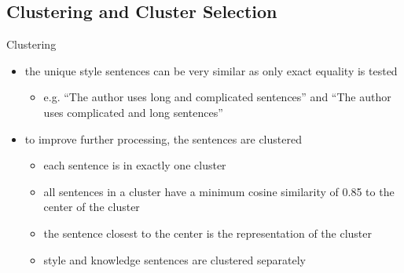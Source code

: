 \documentclass[]{beamer}
\begin{document}
\begin{frame}[shrink]
  
\end{frame}
\begin{frame}[shrink]
  
\end{frame}

\subsection{Clustering and Cluster Selection}
\begin{frame}{Clustering}
  \begin{itemize}
    \item the unique style sentences can be very similar as only exact equality is tested
          \begin{itemize}
            \item e.g. \enquote{The author uses long and complicated sentences} and \enquote{The author uses complicated and long sentences}
          \end{itemize}
    \item to improve further processing, the sentences are clustered
          \pause
          \begin{itemize}
            \item each sentence is in exactly one cluster
            \item all sentences in a cluster have a minimum cosine similarity of \num{0.85} to the center of the cluster
            \item the sentence closest to the center is the representation of the cluster
            \item style and knowledge sentences are clustered separately
          \end{itemize}
  \end{itemize}
\end{frame}
\end{document}
